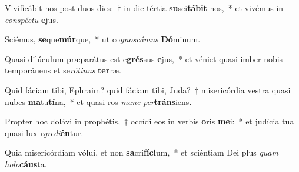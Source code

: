 \item Vivificábit nos post duos dies:~† in die tértia \textbf{su}sci\textbf{tá}\textbf{bit} nos,~* et vivémus in \textit{con}\textit{spéc}\textit{tu} \textbf{e}jus.
\item Sciémus, \textbf{se}que\textbf{múr}que,~* ut co\textit{gnos}\textit{cá}\textit{mus} \textbf{Dó}minum.
\item Quasi dilúculum præparátus est e\textbf{grés}sus \textbf{e}jus,~* et véniet quasi imber nobis temporáneus et se\textit{ró}\textit{ti}\textit{nus} \textbf{ter}ræ.
\item Quid fáciam tibi, Ephraim? quid fáciam tibi, Juda?~† misericórdia vestra quasi nubes \textbf{ma}tu\textbf{tí}na,~* et quasi ros \textit{ma}\textit{ne} \textit{per}\textbf{tráns}iens.
\item Propter hoc dolávi in prophétis,~† occídi eos in verbis \textbf{o}ris \textbf{me}i:~* et judícia tua quasi lux \textit{e}\textit{gre}\textit{di}\textbf{én}tur.
\item Quia misericórdiam vólui, et non \textbf{sa}cri\textbf{fí}\textbf{ci}um,~* et sciéntiam Dei plus \textit{quam} \textit{ho}\textit{lo}\textbf{cáus}ta.
